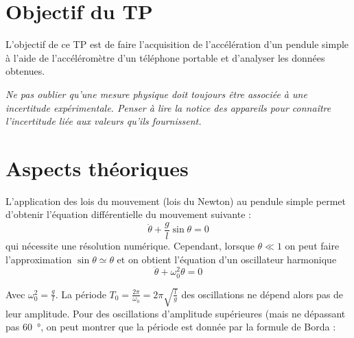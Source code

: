 \documentclass[a4paper]{tp}
\begin{document}

\section{Objectif du TP}
L'objectif de ce TP est de faire l'acquisition de l'accélération d'un pendule simple à l'aide de l'accéléromètre d'un téléphone portable et d'analyser les données obtenues.

\vspace{1em}
\textit{Ne pas oublier qu'une mesure physique doit toujours être associée à une incertitude expérimentale. Penser à lire la notice des appareils pour connaître l'incertitude liée aux valeurs qu'ils fournissent.}

\section{Aspects théoriques}

\begin{center}

\end{center}

L'application des lois du mouvement (lois du Newton) au pendule simple permet d'obtenir l'équation différentielle du mouvement suivante :
\begin{equation*}
\ddot{\theta} + \frac{g}{l} \sin\theta = 0
\end{equation*}
qui nécessite une résolution numérique. Cependant, lorsque $\theta\ll 1$ on peut faire l'approximation $\sin\theta\simeq\theta$ et on obtient l'équation d'un oscillateur harmonique 
\begin{equation*}
\ddot{\theta} + \omega_0^2\theta = 0
\end{equation*}

Avec $\omega_0^2=\frac{g}{l}$. La période $T_0=\frac{2\pi}{\omega_0}=2\pi\sqrt{\frac{l}{g}}$ des oscillations ne dépend alors pas de leur amplitude. Pour des oscillations d'amplitude supérieures (mais ne dépassant pas \SI{60}{\degree}, on peut montrer que la période est donnée par la formule de Borda :
\end{document}
